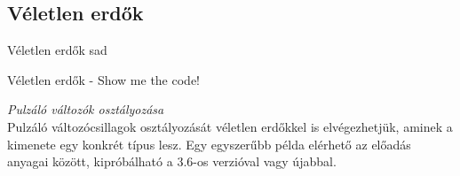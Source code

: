 \subsection{Véletlen erdők}
\begin{frame}{Véletlen erdők}
    sad
\end{frame}

\begin{frame}{Véletlen erdők - Show me the code!}
    
    \Huge{{\it Pulzáló változók osztályozása}} \\
    \vspace{0.5cm}
    \large{Pulzáló változócsillagok osztályozását véletlen erdőkkel is elvégezhetjük, aminek a kimenete egy konkrét típus lesz. Egy egyszerűbb példa elérhető az előadás anyagai között, kipróbálható a 3.6-os verzióval vagy újabbal.}
    
\end{frame}
